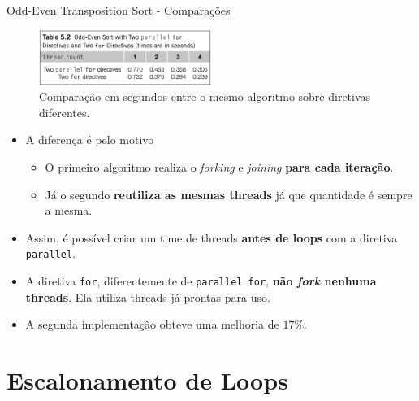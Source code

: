 	\begin{frame}{Odd-Even Transposition Sort - Comparações}
		\begin{figure}[p]
			\centering
			\includegraphics[width=0.5\textwidth]{img/pacheco/odd-even_comparation.png}
			\caption{Comparação em segundos entre o mesmo algoritmo sobre diretivas diferentes.}
		\end{figure}
		\begin{itemize}
			\setlength\itemsep{0.2em}
			\item A diferença é pelo motivo
			\begin{itemize}
				\item O primeiro algoritmo realiza o \textit{forking} e \textit{joining} \textbf{para cada iteração}.
				\item Já o segundo \textbf{reutiliza as mesmas threads} já que quantidade é sempre a mesma.
			\end{itemize}
					\bigskip
			\item Assim, é possível criar um time de threads \textbf{antes de loops} com a diretiva {\tt parallel}.
			\item A diretiva {\tt for}, diferentemente de {\tt parallel for}, \textbf{não \textit{fork} nenhuma threads}. Ela utiliza threads já prontas para uso.
			\item A segunda implementação obteve uma melhoria de \textbf{$17\%$}.
		\end{itemize}
	\end{frame}








\section{Escalonamento de Loops}
